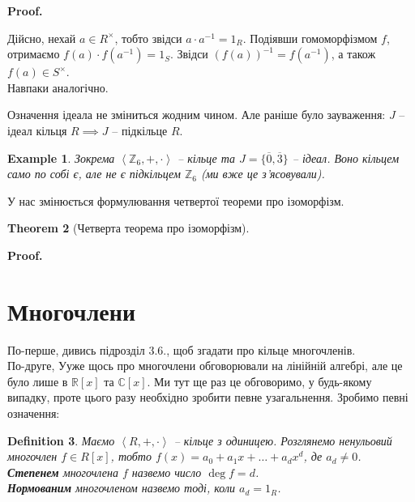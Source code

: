 \documentclass[a4paper, 10pt]{article}
\makeatletter
\theoremstyle{theoremdd}
\newtheorem{theorem}{Theorem}[subsection]
\theoremstyle{theoremdd}
\newtheorem{definition}[theorem]{Definition}
\theoremstyle{theoremdd}
\theoremstyle{theoremdd}
\theoremstyle{theoremdd}
\newtheorem{example}[theorem]{Example}
\theoremstyle{theoremdd}
\theoremstyle{theoremdd}
\theoremstyle{theoremdd}
\theoremstyle{theoremdd}
\theoremstyle{theoremdd}
\theoremstyle{theoremdd}
\theoremstyle{theoremdd}
\theoremstyle{theoremdd}
\theoremstyle{theoremdd}
\theoremstyle{theoremdd}
\renewenvironment{proof}[1][Proof.\\]{\par
\pushQED{\hfill \qed}%
\normalfont \topsep6\p@\@plus6\p@\relax
\trivlist
\item\relax
{\bfseries
#1\@addpunct{.}}\hspace\labelsep\ignorespaces
}{%
\popQED\endtrivlist\@endpefalse
}
\makeatother
\begin{document}
\begin{proof}
Дійсно, нехай $a \in R^\times$, тобто звідси $a \cdot a^{-1} = 1_R$. Подіявши гомоморфізмом $f$, отримаємо $f(a) \cdot f(a^{-1}) = 1_S$. Звідси $(f(a))^{-1} = f(a^{-1})$, а також $f(a) \in S^\times$.\\
Навпаки аналогічно.
\end{proof}

Означення ідеала не зміниться жодним чином. Але раніше було зауваження: $J$ -- ідеал кільця $R \implies J$ -- підкільце $R$. \color{red}{Зараз це вже -- неправда.}
\color{black}{}

\begin{example}
Зокрема $\left< \mathbb{Z}_6, +, \cdot \right>$ -- кільце та $J = \{\overline{0},\overline{3}\}$ -- ідеал. Воно кільцем само по собі є, але не є підкільцем $\mathbb{Z}_6$ (ми вже це з'ясовували).
\end{example}

У нас змінюється формулювання четвертої теореми про ізоморфізм.
\begin{theorem}[Четверта теорема про ізоморфізм]
\end{theorem}

\begin{proof}

\end{proof}

\newpage
\section{Многочлени}
По-перше, дивись підрозділ 3.6., щоб згадати про кільце многочленів.\\
По-друге, Ууже щось про многочлени обговорювали на лінійній алгебрі, але це було лише в $\mathbb{R}[x]$ та $\mathbb{C}[x]$. Ми тут ще раз це обговоримо, у будь-якому випадку, проте цього разу необхідно зробити певне узагальнення. Зробимо певні означення:

\begin{definition}
Маємо $\left< R,+,\cdot\right>$ -- кільце з одиницею. Розглянемо ненульовий многочлен $f \in R[x]$, тобто $f(x) = a_0 + a_1 x + \dots + a_d x^d$, де $a_d \neq 0$.\\
\textbf{Степенем} многочлена $f$ назвемо число $\deg f = d$.\\
\textbf{Нормованим} многочленом назвемо тоді, коли $a_d = 1_R$.
\end{definition}
\end{document}
